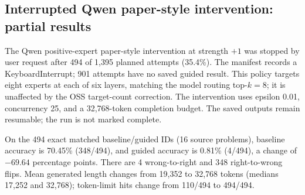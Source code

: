 \subsection{Interrupted Qwen paper-style intervention: partial results}

\label{sec:partial-qwen-paper}

The Qwen positive-expert paper-style intervention at strength $+1$ was stopped by user request after 494 of 1,395 planned attempts (35.4\%). The manifest records a KeyboardInterrupt; 901 attempts have no saved guided result. This policy targets eight experts at each of six layers, matching the model routing top-$k=8$; it is unaffected by the OSS target-count correction. The intervention uses epsilon 0.01, concurrency 25, and a 32,768-token completion budget. The saved outputs remain resumable; the run is not marked complete.

On the 494 exact matched baseline/guided IDs (16 source problems), baseline accuracy is 70.45\% (348/494), and guided accuracy is 0.81\% (4/494), a change of $-69.64$ percentage points. There are 4 wrong-to-right and 348 right-to-wrong flips. Mean generated length changes from 19,352 to 32,768 tokens (medians 17,252 and 32,768); token-limit hits change from 110/494 to 494/494.

\begin{table}[ht]\centering\small

\caption{Partial Qwen paper-style intervention. Accuracy and token counts compare only the same completed IDs in each condition. B/G denotes baseline/guided. A dash indicates no completed guided attempts, not zero accuracy.}

\label{tab:partial-qwen-paper}

\end{table}

